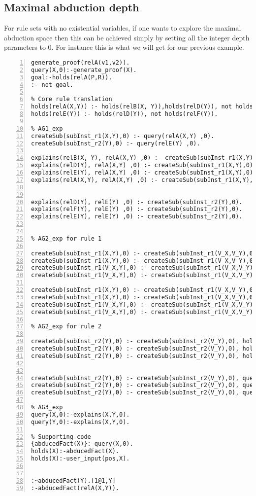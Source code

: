 \documentclass[sigconf]{acmart}
\begin{document}
\subsection{Maximal abduction depth}
For rule sets with no existential variables, if one wants to explore the maximal abduction space then this can be achieved simply by setting all the integer depth parameters to 0. For instance this is what we will get for our previous example.
\begin{lstlisting}[numbers=left]
% Encoding the goal
generate_proof(relA(v1,v2)).
query(X,0):-generate_proof(X).
goal:-holds(relA(P,R)).
:- not goal.

% Core rule translation
holds(relA(X,Y)) :- holds(relB(X, Y)),holds(relD(Y)), not holds(relE(Y)).
holds(relE(Y)) :- holds(relD(Y)), not holds(relF(Y)).

% AG1_exp
createSub(subInst_r1(X,Y),0) :- query(relA(X,Y) ,0).
createSub(subInst_r2(Y),0) :- query(relE(Y) ,0).

explains(relB(X, Y), relA(X,Y) ,0) :- createSub(subInst_r1(X,Y),0).
explains(relD(Y), relA(X,Y) ,0) :- createSub(subInst_r1(X,Y),0).
explains(relE(Y), relA(X,Y) ,0) :- createSub(subInst_r1(X,Y),0).
explains(relA(X,Y), relA(X,Y) ,0) :- createSub(subInst_r1(X,Y),0).


explains(relD(Y), relE(Y) ,0) :- createSub(subInst_r2(Y),0).
explains(relF(Y), relE(Y) ,0) :- createSub(subInst_r2(Y),0).
explains(relE(Y), relE(Y) ,0) :- createSub(subInst_r2(Y),0).


% AG2_exp for rule 1

createSub(subInst_r1(X,Y),0) :- createSub(subInst_r1(V_X,V_Y),0), holds(relA(X,Y)).
createSub(subInst_r1(X,Y),0) :- createSub(subInst_r1(V_X,V_Y),0), holds(relB(X,Y)).
createSub(subInst_r1(V_X,Y),0) :- createSub(subInst_r1(V_X,V_Y),0), holds(relD(Y)).
createSub(subInst_r1(V_X,Y),0) :- createSub(subInst_r1(V_X,V_Y),0), holds(relE(Y)).

createSub(subInst_r1(X,Y),0) :- createSub(subInst_r1(V_X,V_Y),0), query(relA(X,Y),0).
createSub(subInst_r1(X,Y),0) :- createSub(subInst_r1(V_X,V_Y),0), query(relB(X,Y),0).
createSub(subInst_r1(V_X,Y),0) :- createSub(subInst_r1(V_X,V_Y),0), query(relD(Y),0).
createSub(subInst_r1(V_X,Y),0) :- createSub(subInst_r1(V_X,V_Y),0), query(relF(Y),0).

% AG2_exp for rule 2

createSub(subInst_r2(Y),0) :- createSub(subInst_r2(V_Y),0), holds(relE(Y)).
createSub(subInst_r2(Y),0) :- createSub(subInst_r2(V_Y),0), holds(relD(Y)).
createSub(subInst_r2(Y),0) :- createSub(subInst_r2(V_Y),0), holds(relF(Y)).


createSub(subInst_r2(Y),0) :- createSub(subInst_r2(V_Y),0), query(relE(Y),0).
createSub(subInst_r2(Y),0) :- createSub(subInst_r2(V_Y),0), query(relD(Y),0).
createSub(subInst_r2(Y),0) :- createSub(subInst_r2(V_Y),0), query(relF(Y),0).

% AG3_exp
query(X,0):-explains(X,Y,0).
query(Y,0):-explains(X,Y,0).

% Supporting code
{abducedFact(X)}:-query(X,0).
holds(X):-abducedFact(X).
holds(X):-user_input(pos,X).


:~abducedFact(Y).[1@1,Y]
:-abducedFact(relA(X,Y)).
\end{lstlisting}
\end{document}
